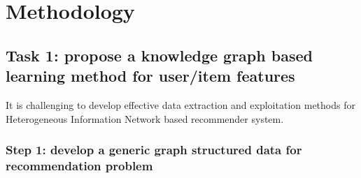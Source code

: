 \section{Methodology}

\subsection{Task 1: propose a knowledge graph based learning method for user/item features}
It is challenging to develop effective data extraction and exploitation methods for Heterogeneous Information Network based recommender system.

\subsubsection*{Step 1: develop a generic graph structured data for recommendation problem}


    




